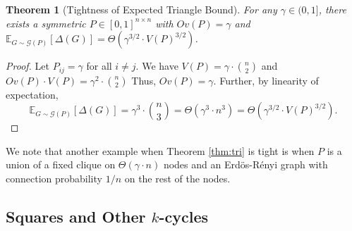 \documentclass{article}
\newtheorem{theorem}{Theorem}
\newcommand{\norm}[1]{\|#1\|}
\newcommand{\E}{\mathbb{E}}
\begin{document}
\begin{theorem}[Tightness of Expected Triangle Bound]\label{thm:tight}
For any $\gamma \in (0,1]$, there exists a symmetric $P \in [0,1]^{n \times n}$ with $Ov(P) = \gamma$ and $\E_{G \sim \mathcal{G}(P)} [\Delta(G)] = \Theta( \gamma^{3/2} \cdot V(P)^{3/2})$.
 \end{theorem}
 \begin{proof}
 Let $P_{ij} = \gamma$ for all $i \neq j $. We have $V(P) = \gamma \cdot {n \choose 2}$ and $Ov(P) \cdot V(P) = \gamma^2 \cdot {n \choose 2}$ Thus, $Ov(P)= \gamma$. Further,  by linearity of expectation, 
 $$\E_{G \sim \mathcal{G}(P)} [\Delta(G)] = \gamma^3 \cdot {n \choose 3} = \Theta(\gamma^3 \cdot n^3) = \Theta(\gamma^{3/2} \cdot V(P)^{3/2}).$$
% 
% 
  \end{proof}
  We note that another example when Theorem \ref{thm:tri} is tight is when $P$ is a union of a fixed clique on $\Theta(\gamma \cdot n)$ nodes and an Erd\"{o}s-R\'{e}nyi graph with connection probability $1/n$ on the rest of the nodes.
  
\subsection{Squares and Other $k$-cycles}
  
\end{document}

